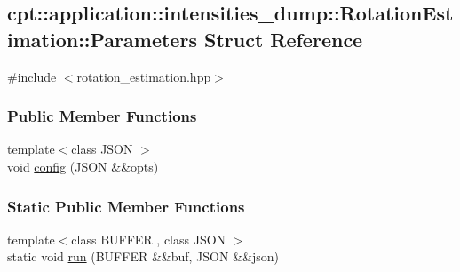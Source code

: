 \hypertarget{structcpt_1_1application_1_1intensities__dump_1_1_rotation_estimation_1_1_parameters}{\subsection{cpt\-:\-:application\-:\-:intensities\-\_\-dump\-:\-:Rotation\-Estimation\-:\-:Parameters Struct Reference}
\label{structcpt_1_1application_1_1intensities__dump_1_1_rotation_estimation_1_1_parameters}
}


{\ttfamily \#include $<$rotation\-\_\-estimation.\-hpp$>$}

\subsubsection*{Public Member Functions}
\begin{DoxyCompactItemize}
\item 
{\footnotesize template$<$class J\-S\-O\-N $>$ }\\void \hyperlink{structcpt_1_1application_1_1intensities__dump_1_1_rotation_estimation_1_1_parameters_accf254e43fe2584eb112ec969b2bd255}{config} (J\-S\-O\-N \&\&opts)
\end{DoxyCompactItemize}
\subsubsection*{Static Public Member Functions}
\begin{DoxyCompactItemize}
\item 
{\footnotesize template$<$class B\-U\-F\-F\-E\-R , class J\-S\-O\-N $>$ }\\static void \hyperlink{structcpt_1_1application_1_1intensities__dump_1_1_rotation_estimation_1_1_parameters_add99d8023c655db1c8282280fcf332e4}{run} (B\-U\-F\-F\-E\-R \&\&buf, J\-S\-O\-N \&\&json)
\end{DoxyCompactItemize}
